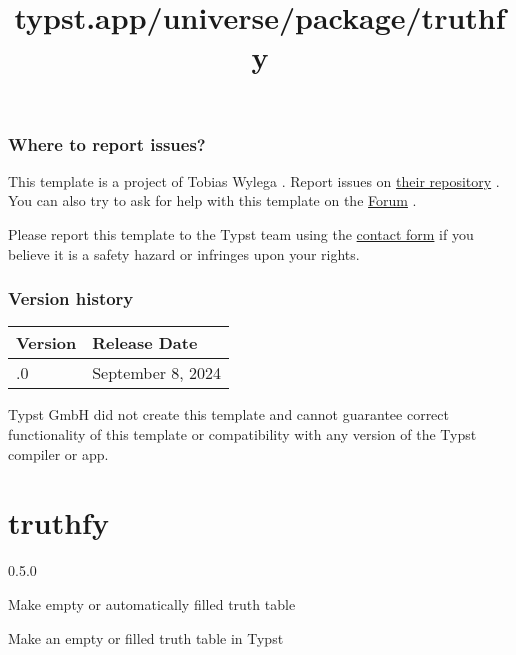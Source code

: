 \subsubsection{Where to report issues?}\label{where-to-report-issues}

This template is a project of Tobias Wylega . Report issues on
\href{https://github.com/MrToWy/hsh-thesis}{their repository} . You can
also try to ask for help with this template on the
\href{https://forum.typst.app}{Forum} .

Please report this template to the Typst team using the
\href{https://typst.app/contact}{contact form} if you believe it is a
safety hazard or infringes upon your rights.

\label{versions}
\subsubsection{Version history}\label{version-history}

\begin{longtable}[]{@{}ll@{}}
\toprule\noalign{}
Version & Release Date \\
\midrule\noalign{}
\endhead
\bottomrule\noalign{}
\endlastfoot
1.0.0 & September 8, 2024 \\
\end{longtable}

Typst GmbH did not create this template and cannot guarantee correct
functionality of this template or compatibility with any version of the
Typst compiler or app.


\title{typst.app/universe/package/truthfy}

\label{banner}
\section{truthfy}\label{truthfy}

{ 0.5.0 }

Make empty or automatically filled truth table

\label{readme}
Make an empty or filled truth table in Typst

